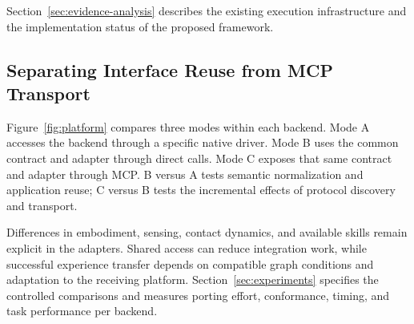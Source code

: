 Section~\ref{sec:evidence-analysis} describes the existing execution infrastructure and the implementation status of the proposed framework.

\subsection{Separating Interface Reuse from MCP Transport}

Figure~\ref{fig:platform} compares three modes within each backend. Mode A accesses the backend through a specific native driver. Mode B uses the common contract and adapter through direct calls. Mode C exposes that same contract and adapter through MCP. B versus A tests semantic normalization and application reuse; C versus B tests the incremental effects of protocol discovery and transport.

Differences in embodiment, sensing, contact dynamics, and available skills remain explicit in the adapters. Shared access can reduce integration work, while successful experience transfer depends on compatible graph conditions and adaptation to the receiving platform. Section~\ref{sec:experiments} specifies the controlled comparisons and measures porting effort, conformance, timing, and task performance per backend.

